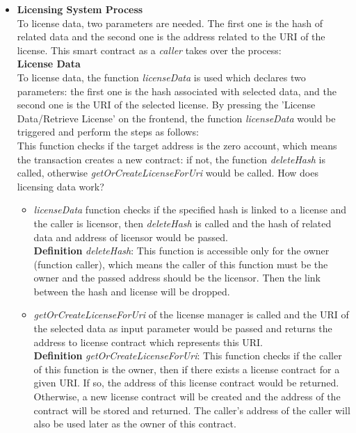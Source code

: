 \begin{itemize}
	\item \textbf{Licensing System Process} \\
    To license data, two parameters are needed. The first one is the hash of related data and the second one is the address related to the URI of the license. This smart contract as a \textit{caller} takes over the process: \\
    \textbf{License Data} \\
    To license data, the function \textit{licenseData} is used which declares two parameters: the first one is the hash associated with selected data, and the second one is the URI of the selected license. By pressing the 'License Data/Retrieve License' on the frontend, the function \textit{licenseData} would be triggered and perform the steps as follows: \\
    This function checks if the target address is the zero account, which means the transaction creates a new contract: 
    if not, the function \textit{deleteHash} is called, otherwise \textit{getOrCreateLicenseForUri} would be called. How does licensing data work? \\
	\begin{itemize}
		\item \textit{licenseData} function checks if the specified hash is linked to a license and the caller is licensor, then \textit{deleteHash} is called and the hash of related data and address of licensor would be passed. \\
		\hspace{1cm} \textbf{Definition} \textit{deleteHash}: This function is accessible only for the owner (function caller), which means the caller of this function must be the owner and the passed address should be the licensor. Then the link between the hash and license will be dropped.
		\item \textit{getOrCreateLicenseForUri} of the license manager is called and the URI of the selected data as input parameter would be passed and returns the address to license contract which represents this URI.\\
		\hspace{1cm}\textbf{Definition} \textit{getOrCreateLicenseForUri}: This function checks if the caller of this function is the owner, then if there exists a license contract for a given URI. If so, the address of this license contract would be returned. Otherwise, a new license contract will be created and the address of the contract will be stored and returned. The caller's address of the caller will also be used later as the owner of this contract.

\end{itemize}
\end{itemize}
